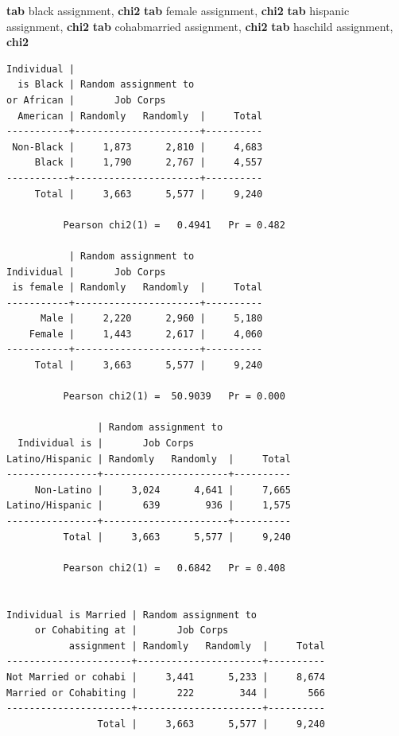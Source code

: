 \documentclass[
]{book}
\newenvironment{Shaded}{\begin{snugshade}}{\end{snugshade}}
\newcommand{\BaseNTok}[1]{\textcolor[rgb]{0.00,0.00,0.81}{#1}}
\newcommand{\FunctionTok}[1]{\textcolor[rgb]{0.13,0.29,0.53}{\textbf{#1}}}
\newcommand{\KeywordTok}[1]{\textcolor[rgb]{0.13,0.29,0.53}{\textbf{#1}}}
\newcommand{\NormalTok}[1]{#1}
\begin{document}
\begin{Shaded}
\begin{Highlighting}[]
\KeywordTok{tab} \BaseNTok{black}\NormalTok{ assignment, }\FunctionTok{chi2}
\KeywordTok{tab}\NormalTok{ female assignment, }\FunctionTok{chi2}
\KeywordTok{tab}\NormalTok{ hispanic assignment, }\FunctionTok{chi2}
\KeywordTok{tab}\NormalTok{ cohabmarried assignment, }\FunctionTok{chi2}
\KeywordTok{tab}\NormalTok{ haschild assignment, }\FunctionTok{chi2}
\end{Highlighting}
\end{Shaded}

\begin{verbatim}
Individual |
  is Black | Random assignment to
or African |       Job Corps
  American | Randomly   Randomly  |     Total
-----------+----------------------+----------
 Non-Black |     1,873      2,810 |     4,683 
     Black |     1,790      2,767 |     4,557 
-----------+----------------------+----------
     Total |     3,663      5,577 |     9,240 

          Pearson chi2(1) =   0.4941   Pr = 0.482

           | Random assignment to
Individual |       Job Corps
 is female | Randomly   Randomly  |     Total
-----------+----------------------+----------
      Male |     2,220      2,960 |     5,180 
    Female |     1,443      2,617 |     4,060 
-----------+----------------------+----------
     Total |     3,663      5,577 |     9,240 

          Pearson chi2(1) =  50.9039   Pr = 0.000

                | Random assignment to
  Individual is |       Job Corps
Latino/Hispanic | Randomly   Randomly  |     Total
----------------+----------------------+----------
     Non-Latino |     3,024      4,641 |     7,665 
Latino/Hispanic |       639        936 |     1,575 
----------------+----------------------+----------
          Total |     3,663      5,577 |     9,240 

          Pearson chi2(1) =   0.6842   Pr = 0.408


Individual is Married | Random assignment to
     or Cohabiting at |       Job Corps
           assignment | Randomly   Randomly  |     Total
----------------------+----------------------+----------
Not Married or cohabi |     3,441      5,233 |     8,674 
Married or Cohabiting |       222        344 |       566 
----------------------+----------------------+----------
                Total |     3,663      5,577 |     9,240 


\end{verbatim}
\end{document}
